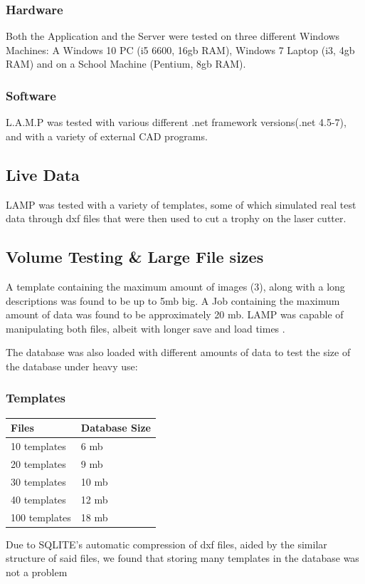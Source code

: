 \documentclass[oneside,openany,11pt,a4paper]{report}
\begin{document}
\subsubsection{Hardware}
Both the Application and the Server were tested on three different Windows Machines: A Windows 10 PC (i5 6600, 16gb RAM), Windows 7 Laptop (i3, 4gb RAM) and on a School Machine (Pentium, 8gb RAM).
\subsubsection{Software}
L.A.M.P was tested with various different .net framework versions(.net 4.5-7), and with a variety of external CAD programs.
\subsection{Live Data}
LAMP was tested with a variety of templates, some of which simulated real test data through dxf files that were then used to cut a trophy on the laser cutter. 
\subsection{Volume Testing \& Large File sizes}
A template containing the maximum amount of images (3), along with a long descriptions was found to be up to 5mb big. A Job containing the maximum amount of data was found to be approximately 20 mb. LAMP was capable of manipulating both files, albeit with longer save and load times .

The database was also loaded with different amounts of data to test the size of the database under heavy use:
\pagebreak
\subsubsection{Templates}
\begin{longtable}{|p{5cm}|p{5cm}|}
	\hline
	\rowcolor{gray!50}
	\textbf{Files} & \textbf{Database Size}   \\ \hline

	10 templates & 6 mb  \\ \hline
	20 templates & 9 mb  \\ \hline
	30 templates & 10 mb  \\ \hline
	40 templates & 12 mb  \\ \hline
	100 templates & 18 mb  \\ \hline

\end{longtable}
Due to SQLITE's automatic compression of dxf files, aided by the similar structure of said files, we found that storing many templates in the database was not a problem
\end{document}
